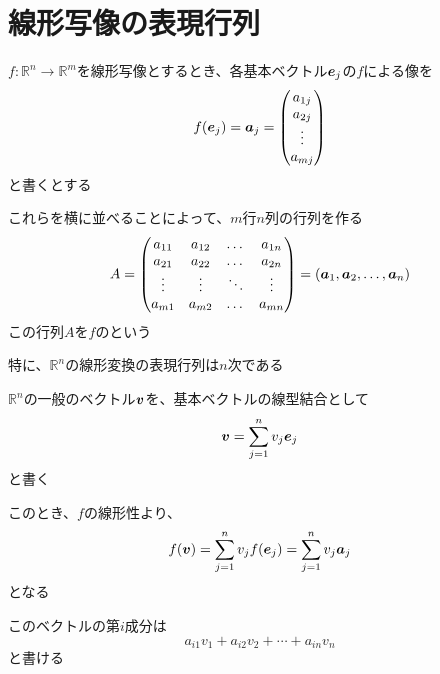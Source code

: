 \documentclass[../../../topic_linear-algebra]{subfiles}
\begin{document}
\sectionline
\section{線形写像の表現行列}\label{sec:matrix-rep-of-linear-maps}

\begin{mindflow}
\end{mindflow}

$f\colon \mathbb{R}^n \to \mathbb{R}^m$を線形写像とするとき、各基本ベクトル$\vb*{e}_j$の$f$による像を
\begin{equation*}
  f(\vb*{e}_j) = \vb*{a}_j = \begin{pmatrix}
    a_{1j} \\
    a_{2j} \\
    \vdots \\
    a_{mj}
  \end{pmatrix}
\end{equation*}
と書くとする

これらを横に並べることによって、$m$行$n$列の行列を作る
\begin{equation*}
  A = \begin{pmatrix}
    a_{11} & a_{12} & \dots  & a_{1n} \\
    a_{21} & a_{22} & \dots  & a_{2n} \\
    \vdots & \vdots & \ddots & \vdots \\
    a_{m1} & a_{m2} & \dots  & a_{mn}
  \end{pmatrix} = (\vb*{a}_1, \vb*{a}_2, \dots, \vb*{a}_n)
\end{equation*}
この行列$A$を$f$のという

\br

特に、$\mathbb{R}^n$の線形変換の表現行列は$n$次である

\sectionline

$\mathbb{R}^n$の一般のベクトル$\vb*{v}$を、基本ベクトルの線型結合として
\begin{equation*}
  \vb*{v} = \sum_{j=1}^n v_j \vb*{e}_j
\end{equation*}
と書く

このとき、$f$の線形性より、
\begin{equation*}
  f(\vb*{v}) = \sum_{j=1}^n v_j f(\vb*{e}_j) = \sum_{j=1}^n v_j \vb*{a}_j
\end{equation*}
となる

このベクトルの第$i$成分は
\begin{equation*}
  a_{i1} v_1 + a_{i2} v_2 + \cdots + a_{in} v_n
\end{equation*}
と書ける
\end{document}
